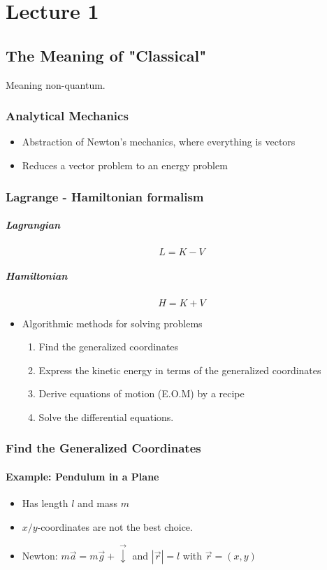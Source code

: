 \chapter{Lecture 1}
\section{The Meaning of "Classical"}
Meaning non-quantum. 
\subsection{Analytical Mechanics}
\begin{itemize}
    \item Abstraction of Newton's mechanics, where everything is vectors
    \item Reduces a vector problem to an energy problem
\end{itemize}

\subsection{Lagrange - Hamiltonian formalism}
\paragraph{Lagrangian}
\[
L = K - V
\]
\paragraph{Hamiltonian}
\[
H = K + V
\]
\begin{itemize}
    \item Algorithmic methods for solving problems
    \begin{enumerate}
        \item Find the generalized coordinates
        \item Express the kinetic energy in terms of the generalized coordinates
        \item Derive equations of motion (E.O.M) by a recipe
        \item Solve the differential equations. 
    \end{enumerate}
\end{itemize}

\subsection{Find the Generalized Coordinates}
\subsubsection{Example: Pendulum in a Plane}
\begin{itemize}
    \item Has length $l$ and mass $m$
    \item $x/y$-coordinates are not the best choice. 
    \item Newton: $m \vec{a} = m \vec{g} + \vec{↓} $ and $\left|\vec{r}\right| = l$ with $\vec{r} = (x,y)$
\end{itemize}
